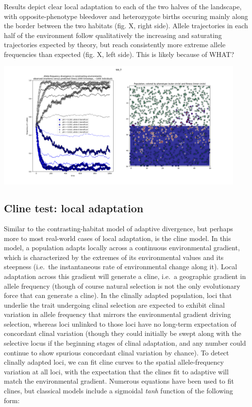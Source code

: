 ﻿\documentclass{article}
\begin{document}
Results depict clear local adaptation to each of the two halves of the landscape,
with opposite-phenotype bleedover and heterozygote births occuring mainly along the border between the two habitats (fig. X, right side). Allele trajectories in each half of the
environment follow qualitatively the increasing and saturating trajectories expected by
theory, but reach consistently more extreme allele frequencies than expected (fig. X,
left side). This is likely because of WHAT?

\includegraphics[width=125mm]{./img/validation/divergence/divergence_test_ca1400_individuals_1000_timesteps.png}


\subsection{Cline test: local adaptation}
Similar to the contrasting-habitat model of adaptive divergence, but perhaps more
to most real-world cases of local adaptation, is the cline model. In this model,
a population adapts locally across a continuous environmental gradient,
which is characterized by the extremes of its environmental values and its steepness
(i.e.\ the instantaneous rate of environmental change along it). Local adaptation
across this gradient will generate a cline, i.e.\ a geographic gradient in allele frequency
(though of course natural selection is not the only evolutionary force that can
generate a cline). In the clinally adapted population, loci that underlie the trait
undergoing clinal selection are expected to exhibit clinal variation in allele frequency
that mirrors the environmental gradient driving selection, whereas loci unlinked to 
those loci have no long-term expectation of concordant clinal variation (though they could
initially be swept along with the selective locus if the beginning stages of clinal
adaptation, and any number could continue to show spurious concordant clinal variation
by chance). To detect clinally adapted loci, we can fit cline curves to the spatial
allele-frequency variation at all loci, with the expectation that the clines fit to
adaptive will match the environmental gradient. Numerous equations have been used
to fit clines, but classical models include a sigmoidal \emph{tanh} function
of the following form:
\end{document}
